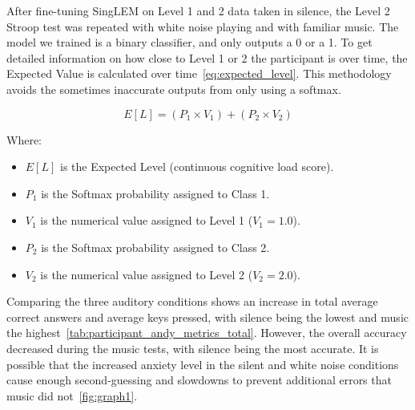 \documentclass[journal]{IEEEtran}
\begin{document}
After fine-tuning SingLEM on Level 1 and 2 data taken in silence, the Level 2 Stroop test was repeated with white noise playing and with familiar music. The model we trained is a binary classifier, and only outputs a 0 or a 1. To get detailed information on how close to Level 1 or 2 the participant is over time, the Expected Value is calculated over time~\ref{eq:expected_level}. This methodology avoids the sometimes inaccurate outputs from only using a softmax.

\begin{equation}
    \label{eq:expected_level}
    E[L] = (P_1 \times V_1) + (P_2 \times V_2)
\end{equation}

Where:
\begin{itemize}
    \item $E[L]$ is the Expected Level (continuous cognitive load score).
    \item $P_1$ is the Softmax probability assigned to Class 1.
    \item $V_1$ is the numerical value assigned to Level 1 ($V_1 = 1.0$).
    \item $P_2$ is the Softmax probability assigned to Class 2.
    \item $V_2$ is the numerical value assigned to Level 2 ($V_2 = 2.0$).
\end{itemize}

Comparing the three auditory conditions shows an increase in total average correct answers and average keys pressed, with silence being the lowest and music the highest~\ref{tab:participant_andy_metrics_total}. However, the overall accuracy decreased during the music tests, with silence being the most accurate. It is possible that the increased anxiety level in the silent and white noise conditions cause enough second-guessing and slowdowns to prevent additional errors that music did not~\ref{fig:graph1}.

\begin{table}[htbp]
    \centering
    \caption{Aggregated Stroop test metrics for Andy. Data reflects total averages per run across different auditory conditions~\cite{jtof-dev_EE-499_2026}.}
    \label{tab:participant_andy_metrics_total}
\end{table}
\end{document}
